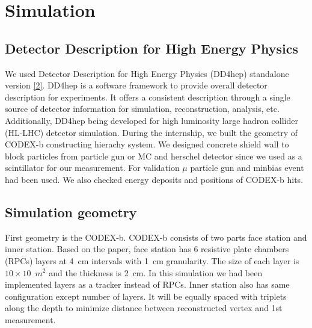 \section{Simulation}
\label{sec:Simulation}

\subsection{Detector Description for High Energy Physics}
We used Detector Description for High Energy Physics (DD4hep) standalone version \href{https://dd4hep.web.cern.ch/dd4hep/}{[2]}.
DD4hep is a software framework to provide overall detector description for experiments.
It offers a consistent description through a single source of detector information for simulation, reconstruction, analysis, etc.
Additionally, DD4hep being developed for high luminosity large hadron collider (HL-LHC) detector simulation.
During the internship, we built the geometry of CODEX-b constructing hierachy system.
We designed concrete shield wall to block particles from particle gun or MC and herschel detector since we used as a scintillator for our measurement.
For validation $\mu$ particle gun and minbias event had been used.
We also checked energy deposits and positions of CODEX-b hits. 


\subsection{Simulation geometry}
First geometry is the CODEX-b.
CODEX-b consists of two parts face station and inner station.
Based on the paper, face station has 6 resistive plate chambers (RPCs) layers at 4~cm intervals with 1~cm granularity.
The size of each layer is $10 \times 10$~$m^{2}$ and the thickness is 2~cm. 
In this simulation we had been implemented layers as a tracker instead of RPCs.
Inner station also has same configuration except number of layers.
It will be equally spaced with triplets along the depth to minimize distance between reconstructed vertex and 1st measurement. 

